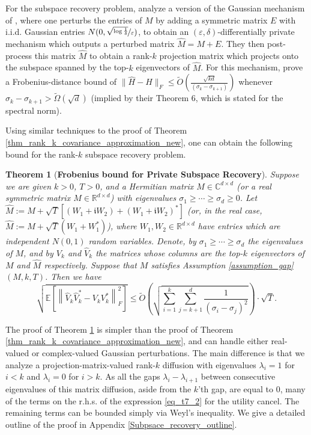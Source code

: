 \documentclass[11pt,letterpaper]{article}
\newcommand{\nfrac}{\nicefrac}
\newcommand{\eps}{\varepsilon}
\newtheorem{theorem}{Theorem}[section]
\begin{document}
For the subspace recovery problem, 
 \cite{dwork2014analyze} analyze a version of the Gaussian mechanism of \cite{dwork2006our}, where one perturbs the entries of $M$ by adding a symmetric matrix $E$ with i.i.d. Gaussian entries $N(0,\nfrac{\sqrt{\log\frac{1}{\delta}}}{\eps})$, to obtain an $(\eps, \delta)$-differentially private mechanism which outputs a perturbed matrix $\hat{M} = M+E$.
%
They then post-process this matrix $\hat{M}$ to obtain a rank-$k$ projection matrix which projects onto the subspace spanned by the top-$k$ eigenvectors of $\hat{M}$.
%
For this mechanism, \cite{dwork2014analyze} prove a Frobenius-distance bound of  $\|\hat{H}- H\|_F \leq \tilde{O}\left(\frac{\sqrt{kd}}{(\sigma_k - \sigma_{k+1})}\right)$  whenever $\sigma_k - \sigma_{k+1} > \tilde{\Omega}(\sqrt{d})$ (implied by their Theorem 6, which is stated for the spectral norm).


Using similar techniques to the proof of Theorem \ref{thm_rank_k_covariance_approximation_new}, one can obtain the following bound for the rank-$k$ subspace recovery problem.
%
%
%
 \begin{theorem}[\bf Frobenius  bound for Private Subspace Recovery] \label{thm_rank_k_subspace}
Suppose we are given $k>0$, $T>0$, and a Hermitian matrix  $M \in \mathbb{C}^{d \times d}$ (or a real symmetric matrix $M \in \mathbb{R}^{d \times d}$) with eigenvalues  $\sigma_1 \geq \cdots \geq \sigma_d \geq 0$.   
%
Let $\hat{M} := M + \sqrt{T}[(W_1 + \mathfrak{i}W_2) + (W_1 + \mathfrak{i}W_2)^\ast]$ (or, in the real case, $\hat{M} := M + \sqrt{T}(W_1 + W_1^\ast)$), where $W_1, W_2 \in \mathbb{R}^{d \times d}$ have entries which are independent $N(0,1)$ random variables.
%
 Denote, by  $\sigma_1 \geq \cdots \geq \sigma_d$ the eigenvalues of $M$, and by $V_k$ and  $\hat{V}_k$ the matrices whose columns are the top-$k$ eigenvectors of $M$ and $\hat{M}$ respectively. 
%
%
Suppose that $M$ satisfies Assumption \ref{assumption_gap} $(M, k, T)$.  
%
%
Then we have
$$ 
\sqrt{\mathbb{E}\left[\left\|\hat{V}_k\hat{V}_k^\ast -  V_k V_k^\ast \right \|_F^2\right]} \leq \tilde{O}\left(\sqrt{\sum_{i=1}^k \sum_{j= k+1}^d \frac{1}{(\sigma_i - \sigma_j)^2}}\right)\cdot \sqrt{T}.
$$
\end{theorem}
%
\noindent
%
The proof of Theorem \ref{thm_rank_k_subspace} is simpler than the proof of Theorem \ref{thm_rank_k_covariance_approximation_new}, and can handle either real-valued or complex-valued Gaussian perturbations.
%
The main difference is that we analyze a projection-matrix-valued rank-$k$ diffusion with eigenvalues $\lambda_i =1$ for $i<k$
 and $\lambda_i =0$ for $i>k$.
 As all the gaps $\lambda_i-\lambda_{i+1}$ between consecutive eigenvalues of this matrix diffusion, aside from the $k$'th gap, are equal to $0$, many of the terms on the r.h.s. of the expression \eqref{eq_t7_2} for the utility cancel.
 The remaining terms can be bounded simply via Weyl's inequality. 
We give a detailed outline of the proof in Appendix \ref{Subpsace_recovery_outline}.
\end{document}
